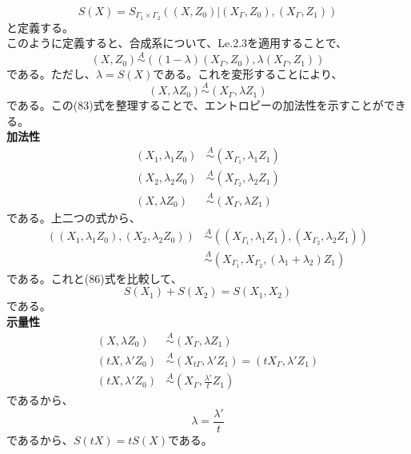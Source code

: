\documentclass[a4paper,11pt]{jsarticle}
\begin{document}
\begin{equation}
    S(X)=S_{\Gamma_1 \times \Gamma_2}((X,Z_0)|(X_{\Gamma},Z_0),(X_{\Gamma},Z_1))
\end{equation}
と定義する。\\
このように定義すると、合成系について、Le.2.3を適用することで、
\begin{equation}
    (X,Z_0) \overset{A}{\sim} ((1-\lambda)(X_{\Gamma},Z_0),\lambda(X_{\Gamma},Z_1))
\end{equation}
である。ただし、$\lambda = S(X)$である。これを変形することにより、
\begin{equation}
    (X,\lambda Z_0) \overset{A}{\sim} (X_{\Gamma},\lambda Z_1)
\end{equation}
である。この(83)式を整理することで、エントロピーの加法性を示すことができる。\\
\textbf{加法性}\\
\begin{align}
    (X_1,\lambda_1 Z_0) &\overset{A}{\sim} (X_{\Gamma_1},\lambda_1 Z_1)\\
    (X_2,\lambda_2 Z_0) &\overset{A}{\sim} (X_{\Gamma_2},\lambda_2 Z_1)\\
    (X,\lambda Z_0) &\overset{A}{\sim} (X_{\Gamma},\lambda Z_1)
\end{align}
である。上二つの式から、
\begin{align}
    ((X_1,\lambda_1 Z_0),(X_2,\lambda_2 Z_0)) &\overset{A}{\sim} ((X_{\Gamma_1},\lambda_1 Z_1),(X_{\Gamma_2},\lambda_2 Z_1))\\
    &\overset{A}{\sim} (X_{\Gamma_1},X_{\Gamma_2},(\lambda_1+\lambda_2)Z_1)
\end{align}
である。これと(86)式を比較して、
\begin{equation}
    S(X_1)+S(X_2) = S(X_1,X_2)
\end{equation}
である。\\
\textbf{示量性}\\
\begin{align}
    (X,\lambda Z_0) &\overset{A}{\sim} (X_{\Gamma},\lambda Z_1)\\
    (tX,\lambda' Z_0) &\overset{A}{\sim} (X_{t\Gamma},\lambda' Z_1)=(tX_{\Gamma},\lambda' Z_1)\\
    (tX,\lambda' Z_0) &\overset{A}{\sim} (X_{\Gamma},\frac{\lambda'}{t} Z_1)
\end{align}
であるから、
\begin{equation}
    \lambda = \frac{\lambda'}{t}
\end{equation}
であるから、$S(tX)=tS(X)$である。\\
\end{document}
